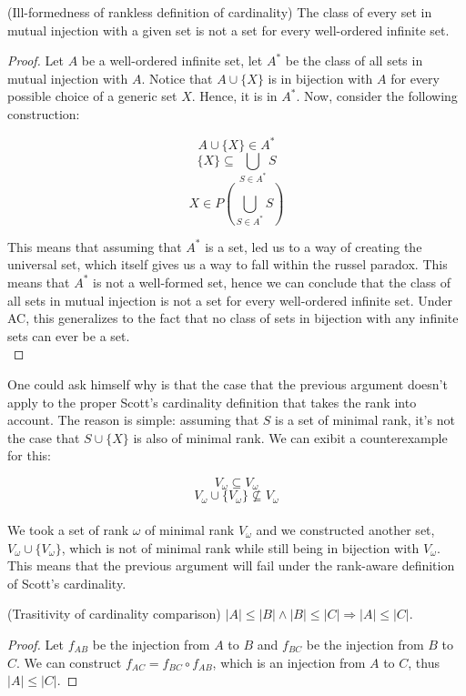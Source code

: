 \begin{lemma}(Ill-formedness of rankless definition of cardinality) 
    The class of every set in mutual injection with a given set is not a set for every 
    well-ordered infinite set.
\end{lemma}
\begin{proof}
    Let $A$ be a well-ordered infinite set, let $A^*$ be the class of all sets in mutual 
    injection with $A$. Notice that $A \cup \{X\}$ is in bijection with $A$ for every
    possible choice of a generic set $X$. Hence, it is in $A^*$. Now, consider the following construction:

    $$ A \cup \{X\} \in A^* $$ \vspace{0.05cm}
    $$ \{X\} \subseteq \bigcup_{S \in A^*} S $$
    $$ X \in P(\bigcup_{S \in A^*} S) $$
    
    This means that assuming that $A^*$ is a set, led us to a way of creating the universal set, 
    which itself gives us a way to fall within the russel paradox. This means that $A^*$ is not a 
    well-formed set, hence we can conclude that the class of all sets in mutual injection is not 
    a set for every well-ordered infinite set. Under AC, this generalizes to the fact that 
    no class of sets in bijection with any infinite sets can ever be a set. \\

\end{proof}

\newpage

One could ask himself why is that the case that the previous argument doesn't apply 
to the proper Scott's cardinality definition that takes the rank into account. The 
reason is simple: assuming that $S$ is a set of minimal rank, it's not the case that 
$ S \cup \{X\}$ is also of minimal rank. We can exibit a counterexample for this:

$$ V_{\omega} \subseteq V_{\omega} $$
$$ V_{\omega} \cup \{ V_{\omega} \} \not\subseteq V_{\omega} $$ \\

We took a set of rank $\omega$ of minimal rank $V_{\omega}$ and we 
constructed another set, $V_{\omega} \cup \{ V_{\omega} \}$, which is not of minimal rank while 
still being in bijection with $V_{\omega}$. This means that the previous argument will fail 
under the rank-aware definition of Scott's cardinality. \\

\begin{lemma}(Trasitivity of cardinality comparison) 
    $|A| \leq |B| \land |B| \leq |C| \Rightarrow |A| \leq |C|$.
\end{lemma}
\begin{proof}
    Let $f_{AB}$ be the injection from $A$ to $B$ and $f_{BC}$ be the injection from $B$ to $C$.
    We can construct $f_{AC} = f_{BC} \circ f_{AB}$, which is an injection from $A$ to $C$, thus $|A| \leq |C|$.
\end{proof} 

